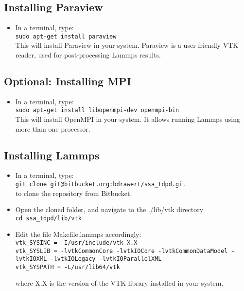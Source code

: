 \documentclass[a4paper,12pt,oneside]{report}
\begin{document}
\subsection{Installing Paraview}
\begin{itemize}
\item In a terminal, type:\\

 \texttt{sudo apt-get install paraview}\\

This will install Paraview in your system. Paraview is a user-friendly VTK reader, used for post-processing Lammps results.


\end{itemize}



\subsection{Optional: Installing MPI}
\begin{itemize}
\item In a terminal, type: \\

  \texttt{sudo apt-get install libopenmpi-dev openmpi-bin}\\
  
This will install OpenMPI in your system. It allows running Lammps using more than one processor.

\end{itemize}


\pagebreak

\subsection{Installing Lammps}
\begin{itemize}
\item In a terminal, type:\\

\texttt{git clone git@bitbucket.org:bdrawert/ssa\_tdpd.git}\\
  
to clone the repository from Bitbucket.


\item Open the cloned folder, and navigate to the ./lib/vtk directory \\

\texttt{cd ssa\_tdpd/lib/vtk}\\

\item Edit the file Makefile.lammps accordingly:\\


\texttt{vtk\_SYSINC = -I/usr/include/vtk-X.X\\
vtk\_SYSLIB = -lvtkCommonCore -lvtkIOCore -lvtkCommonDataModel -lvtkIOXML -lvtkIOLegacy -lvtkIOParallelXML\\
vtk\_SYSPATH = -L/usr/lib64/vtk}

where X.X is the version of the VTK library installed in your system.

\end{itemize}
\end{document}
